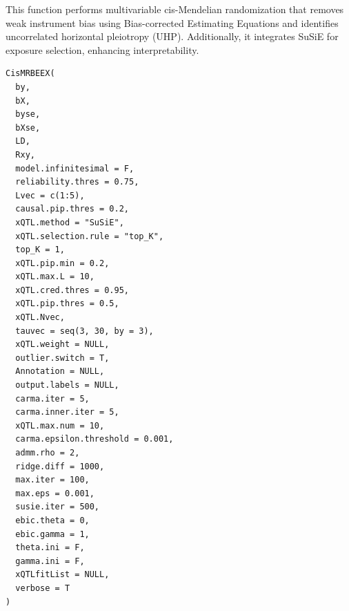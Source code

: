 \documentclass[a4paper]{book}
\begin{document}
%
\begin{Description}
This function performs multivariable cis-Mendelian randomization that removes weak instrument bias using Bias-corrected Estimating Equations and identifies uncorrelated horizontal pleiotropy (UHP). Additionally, it integrates SuSiE for exposure selection, enhancing interpretability.
\end{Description}
%
\begin{Usage}
\begin{verbatim}
CisMRBEEX(
  by,
  bX,
  byse,
  bXse,
  LD,
  Rxy,
  model.infinitesimal = F,
  reliability.thres = 0.75,
  Lvec = c(1:5),
  causal.pip.thres = 0.2,
  xQTL.method = "SuSiE",
  xQTL.selection.rule = "top_K",
  top_K = 1,
  xQTL.pip.min = 0.2,
  xQTL.max.L = 10,
  xQTL.cred.thres = 0.95,
  xQTL.pip.thres = 0.5,
  xQTL.Nvec,
  tauvec = seq(3, 30, by = 3),
  xQTL.weight = NULL,
  outlier.switch = T,
  Annotation = NULL,
  output.labels = NULL,
  carma.iter = 5,
  carma.inner.iter = 5,
  xQTL.max.num = 10,
  carma.epsilon.threshold = 0.001,
  admm.rho = 2,
  ridge.diff = 1000,
  max.iter = 100,
  max.eps = 0.001,
  susie.iter = 500,
  ebic.theta = 0,
  ebic.gamma = 1,
  theta.ini = F,
  gamma.ini = F,
  xQTLfitList = NULL,
  verbose = T
)
\end{verbatim}
\end{Usage}
%
\end{document}
